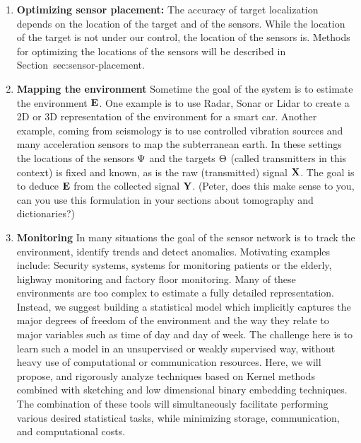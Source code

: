\begin{enumerate}
    \item {\bf Optimizing sensor placement:} The accuracy of target
      localization depends on the location of the target and of the
      sensors. While the location of the target is not under our
      control, the location of the sensors is. Methods for optimizing
      the locations of the sensors will be described in
      Section~{sec:sensor-placement.}
    
    \item{\bf Mapping the environment} Sometime the goal of the system
      is to estimate the environment $\mathbf{E}$. One example is to use
      Radar, Sonar or Lidar to create a 2D or 3D representation of the
      environment for a smart car. Another example, coming from
      seismology is to use controlled vibration sources and many
      acceleration sensors to map the subterranean earth. In these
      settings the locations of the sensors $\Psi$ and the targets
      $\Theta$ (called transmitters in this context) is fixed and
      known, as is the raw (transmitted) signal $\mathbf{X}$. The goal
      is to deduce $\mathbf{E}$ from the collected signal
      $\mathbf{Y}$. (Peter, does this make sense to you, can you use
      this formulation in your sections about tomography and
      dictionaries?)
    
    \item {\bf Monitoring} \label{item:monitoring} In many situations the goal of the sensor
      network is to track the environment, identify trends and detect
      anomalies. Motivating examples include: Security systems,
      systems for monitoring patients or the elderly, highway
      monitoring and factory floor monitoring. Many of these
      environments are too complex to estimate a fully detailed
      representation. Instead, we suggest building a statistical model
      which implicitly captures the major degrees of freedom of the
      environment and the way they relate to major variables such as
      time of day and day of week.  The challenge here is to learn
      such a model in an unsupervised or weakly supervised way,
      without heavy use of computational or communication
      resources. Here, we will propose, and rigorously analyze
      techniques based on Kernel methods combined with sketching and
      low dimensional binary embedding techniques. The combination of
      these tools will simultaneously facilitate performing various
      desired statistical tasks, while minimizing storage,
      communication, and computational costs.
    
\end{enumerate}

